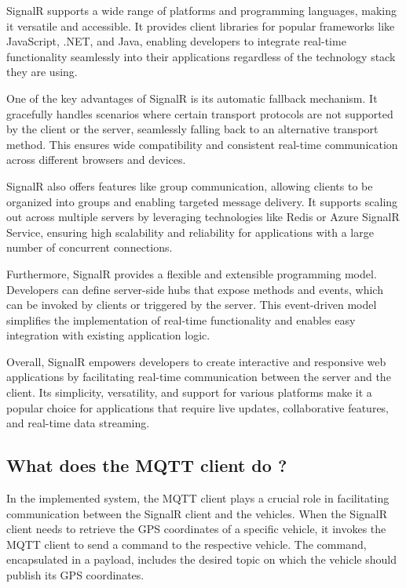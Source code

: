 \documentclass[
12pt,
oneside, 
onehalfspacing, 
nolistspacing, 
parskip, 
chapterinoneline, 
]{AASTCOMPUTER}
\begin{document}
SignalR supports a wide range of platforms and programming languages, making it versatile and accessible. It provides client libraries for popular frameworks like JavaScript, .NET, and Java, enabling developers to integrate real-time functionality seamlessly into their applications regardless of the technology stack they are using.

One of the key advantages of SignalR is its automatic fallback mechanism. It gracefully handles scenarios where certain transport protocols are not supported by the client or the server, seamlessly falling back to an alternative transport method. This ensures wide compatibility and consistent real-time communication across different browsers and devices.

SignalR also offers features like group communication, allowing clients to be organized into groups and enabling targeted message delivery. It supports scaling out across multiple servers by leveraging technologies like Redis or Azure SignalR Service, ensuring high scalability and reliability for applications with a large number of concurrent connections.

Furthermore, SignalR provides a flexible and extensible programming model. Developers can define server-side hubs that expose methods and events, which can be invoked by clients or triggered by the server. This event-driven model simplifies the implementation of real-time functionality and enables easy integration with existing application logic.

Overall, SignalR empowers developers to create interactive and responsive web applications by facilitating real-time communication between the server and the client. Its simplicity, versatility, and support for various platforms make it a popular choice for applications that require live updates, collaborative features, and real-time data streaming.

\subsection{What does the MQTT client do ?}
In the implemented system, the MQTT client plays a crucial role in facilitating communication between the SignalR client and the vehicles. When the SignalR client needs to retrieve the GPS coordinates of a specific vehicle, it invokes the MQTT client to send a command to the respective vehicle. The command, encapsulated in a payload, includes the desired topic on which the vehicle should publish its GPS coordinates.
\end{document}
